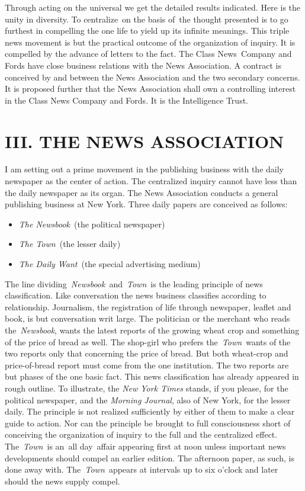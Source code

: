 \documentclass[twoside,symmetric,nobib,justified]{tufte-book}
\begin{document}
Through acting on the universal we get the detailed results indicated.
Here is the unity in diversity. To centralize~on the basis of~the
thought presented is to go furthest in compelling the one life to yield
up its infinite meanings. This triple news movement is but the practical
outcome of the organization of inquiry. It is compelled by the advance
of letters to the fact. The Class News~Company and Fords have close
business relations with the News Association. A contract is conceived by
and between the News Association and the two secondary concerns. It is
proposed further that the News Association shall own a controlling
interest in the Class News Company and Fords. It is the Intelligence
Trust.~

\hypertarget{iii-the-news-association}{%
\section{III. THE NEWS ASSOCIATION}\label{iii-the-news-association}}

I am setting out a prime movement in the publishing business with the
daily newspaper as the center of action. The centralized inquiry cannot
have less than the daily newspaper as its organ. The News Association
conducts a general publishing business at New York. Three daily papers
are conceived as follows:~

\begin{itemize}
\item
  \emph{The Newsbook}~(the political newspaper)~
\item
  \emph{The Town}~(the lesser daily)~
\item
  \emph{The Daily Want}~(the special advertising medium)~
\end{itemize}

The line dividing\emph{~Newsbook}~and~\emph{Town}~is the leading
principle of news classification. Like conversation the news business
classifies according to relationship. Journalism, the registration of
life through newspaper, leaflet and book, is but conversation writ
large. The politician or the merchant who reads the~\emph{Newsbook},
wants the latest reports of the growing wheat crop and something of the
price of bread as well. The shop-girl who prefers the\emph{~Town}~wants
of the two reports only that concerning the price of bread. But both
wheat-crop and price-of-bread report must come from the one institution.
The two reports are but phases of the one basic fact. This news
classification has already appeared in rough outline. To illustrate, the
\emph{New York Times} stands, if you please, for the political
newspaper, and the \emph{Morning Journal}, also of New York, for the
lesser daily. The principle is not realized sufficiently by either of
them to make a clear guide to action. Nor can the principle be brought
to full consciousness short of conceiving the organization of inquiry to
the full and the centralized effect. The~\emph{Town~}is an~all
day~affair appearing first at noon unless important news developments
should compel an earlier edition. The afternoon paper, as such, is done
away with. The\emph{~Town~}appears at intervals up to six o'clock and
later should the news supply compel.~
\end{document}
